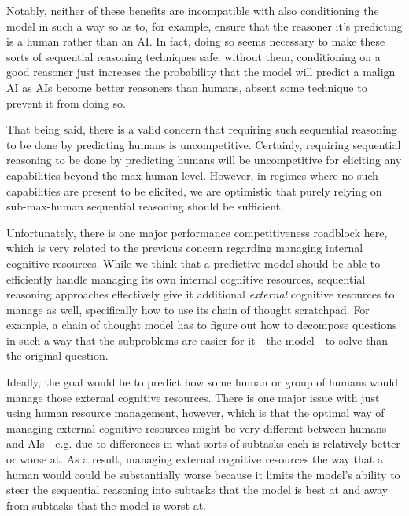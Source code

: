 \documentclass[
  twocolumn,
  natbib,
]{miri-tech-article}
\begin{document}
Notably, neither of these benefits are incompatible with also conditioning the model in such a way so as to, for example, ensure that the reasoner it's predicting is a human rather than an AI. In fact, doing so seems necessary to make these sorts of sequential reasoning techniques safe: without them, conditioning on a good reasoner just increases the probability that the model will predict a malign AI as AIs become better reasoners than humans, absent some technique to prevent it from doing so.

That being said, there is a valid concern that requiring such sequential reasoning to be done by predicting humans is uncompetitive. Certainly, requiring sequential reasoning to be done by predicting humans will be uncompetitive for eliciting any capabilities beyond the max human level. However, in regimes where no such capabilities are present to be elicited, we are optimistic that purely relying on sub-max-human sequential reasoning should be sufficient.

Unfortunately, there is one major performance competitiveness roadblock here, which is very related to the previous concern regarding managing internal cognitive resources. While we think that a predictive model should be able to efficiently handle managing its own internal cognitive resources, sequential reasoning approaches effectively give it additional \textit{external} cognitive resources to manage as well, specifically how to use its chain of thought scratchpad. For example, a chain of thought model has to figure out how to decompose questions in such a way that the subproblems are easier for it---the model---to solve than the original question.

Ideally, the goal would be to predict how some human or group of humans would manage those external cognitive resources. There is one major issue with just using human resource management, however, which is that the optimal way of managing external cognitive resources might be very different between humans and AIs---e.g. due to differences in what sorts of subtasks each is relatively better or worse at. As a result, managing external cognitive resources the way that a human would could be substantially worse because it limits the model's ability to steer the sequential reasoning into subtasks that the model is best at and away from subtasks that the model is worst at.
\end{document}
